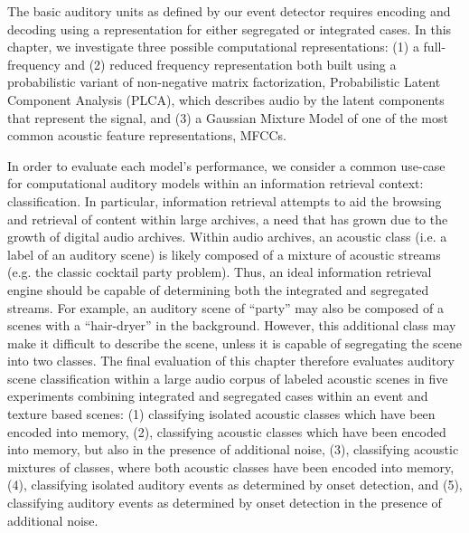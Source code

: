 \documentclass[a4paper,10pt,final]{ThesisStyle}
\begin{document}

The basic auditory units as defined by our event detector requires encoding and decoding using a representation for either segregated or integrated cases.  In this chapter, we investigate three possible computational representations: (1) a full-frequency and (2) reduced frequency representation both built using a probabilistic variant of non-negative matrix factorization, Probabilistic Latent Component Analysis (PLCA), which describes audio by the latent components that represent the signal, and (3) a Gaussian Mixture Model of one of the most common acoustic feature representations, MFCCs. 

In order to evaluate each model's performance, we consider a common use-case for computational auditory models within an information retrieval context: classification.  In particular, information retrieval attempts to aid the browsing and retrieval of content within large archives, a need that has grown due to the growth of digital audio archives.  Within audio archives, an acoustic class (i.e. a label of an auditory scene) is likely composed of a mixture of acoustic streams (e.g. the classic cocktail party problem).  Thus, an ideal information retrieval engine should be capable of determining both the integrated and segregated streams.  For example, an auditory scene of ``party'' may also be composed of a scenes with a ``hair-dryer'' in the background.  However, this additional class may make it difficult to describe the scene, unless it is capable of segregating the scene into two classes.  The final evaluation of this chapter therefore evaluates auditory scene classification within a large audio corpus of labeled acoustic scenes in five experiments combining integrated and segregated cases within an event and texture based scenes: (1) classifying isolated acoustic classes which have been encoded into memory, (2), classifying acoustic classes which have been encoded into memory, but also in the presence of additional noise, (3), classifying acoustic mixtures of classes, where both acoustic classes have been encoded into memory, (4), classifying isolated auditory events as determined by onset detection, and (5), classifying auditory events as determined by onset detection in the presence of additional noise.  
\end{document}
